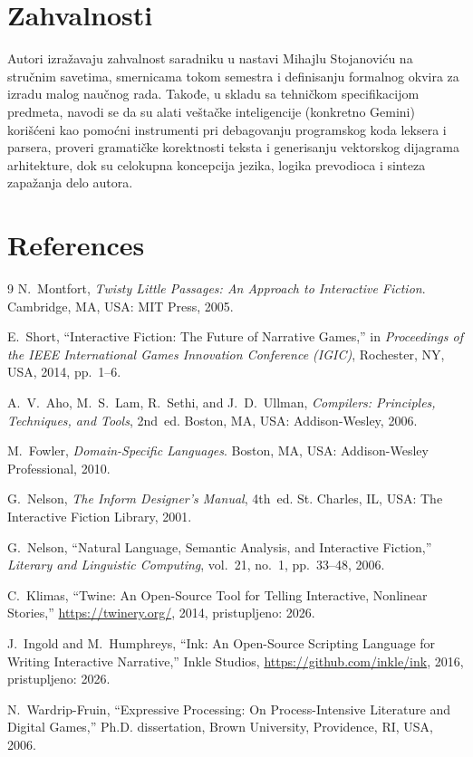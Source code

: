 \documentclass[12pt,a4paper]{article}
\begin{document}
\section{Zahvalnosti}
Autori izražavaju zahvalnost saradniku u nastavi Mihajlu Stojanoviću na stručnim savetima, smernicama tokom semestra i definisanju formalnog okvira za izradu malog naučnog rada. Takođe, u skladu sa tehničkom specifikacijom predmeta, navodi se da su alati veštačke inteligencije (konkretno Gemini) korišćeni kao pomoćni instrumenti pri debagovanju programskog koda leksera i parsera, proveri gramatičke korektnosti teksta i generisanju vektorskog dijagrama arhitekture, dok su celokupna koncepcija jezika, logika prevodioca i sinteza zapažanja delo autora.

\section{References}
\begingroup
\renewcommand{\section}[2]{}
\begin{thebibliography}{9}
  N.~Montfort, \emph{Twisty Little Passages: An Approach to Interactive Fiction}. Cambridge, MA, USA: MIT Press, 2005.

  E.~Short, ``Interactive Fiction: The Future of Narrative Games,'' in \emph{Proceedings of the IEEE International Games Innovation Conference (IGIC)}, Rochester, NY, USA, 2014, pp.~1--6.

  A.~V.~Aho, M.~S.~Lam, R.~Sethi, and J.~D.~Ullman, \emph{Compilers: Principles, Techniques, and Tools}, 2nd~ed. Boston, MA, USA: Addison-Wesley, 2006.

  M.~Fowler, \emph{Domain-Specific Languages}. Boston, MA, USA: Addison-Wesley Professional, 2010.

  G.~Nelson, \emph{The Inform Designer's Manual}, 4th~ed. St. Charles, IL, USA: The Interactive Fiction Library, 2001.

  G.~Nelson, ``Natural Language, Semantic Analysis, and Interactive Fiction,'' \emph{Literary and Linguistic Computing}, vol.~21, no.~1, pp.~33--48, 2006.

  C.~Klimas, ``Twine: An Open-Source Tool for Telling Interactive, Nonlinear Stories,'' \url{https://twinery.org/}, 2014, pristupljeno: 2026.

  J.~Ingold and M.~Humphreys, ``Ink: An Open-Source Scripting Language for Writing Interactive Narrative,'' Inkle Studios, \url{https://github.com/inkle/ink}, 2016, pristupljeno: 2026.

  N.~Wardrip-Fruin, ``Expressive Processing: On Process-Intensive Literature and Digital Games,'' Ph.D. dissertation, Brown University, Providence, RI, USA, 2006.
\end{thebibliography}
\endgroup
\end{document}
